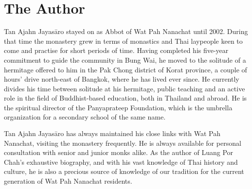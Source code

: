 \section{The Author}

Tan Ajahn Jayasāro stayed on as Abbot of Wat Pah Nanachat until
2002. During that time the monastery grew in terms of monastics and Thai
laypeople keen to come and practise for short periods of time. Having
completed his five-year commitment to guide the community in Bung Wai, 
he moved to the solitude of a hermitage offered to him in the Pak Chong
district of Korat province, a couple of hours' drive north-east of
Bangkok, where he has lived ever since. He currently divides his time
between solitude at his hermitage, public teaching and an active role in
the field of Buddhist-based education, both in Thailand and abroad. He
is the spiritual director of the Panyaprateep Foundation, which is the
umbrella organization for a secondary school of the same name. 

Tan Ajahn Jayasāro has always maintained his close links with Wat
Pah Nanachat, visiting the monastery frequently. He is always available
for personal consultation with senior and junior monks alike. As the
author of Luang Por Chah's exhaustive biography, and with his vast
knowledge of Thai history and culture, he is also a precious source of
knowledge of our tradition for the current generation of Wat Pah
Nanachat residents. 


